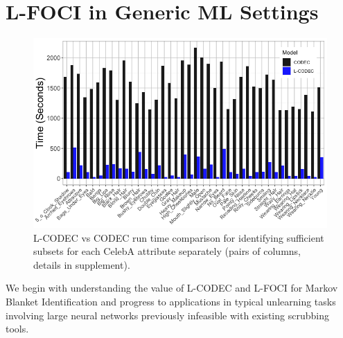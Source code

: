 \section{L-FOCI in Generic ML Settings}
\begin{figure}
    \centering
    \includegraphics[width=0.98\columnwidth,trim={0, 0, 0, 0},clip]{5_unlearn/figs/Speed_Hist.png}
    \caption[Speedups from L-CODEC randomization]{\label{fig:speed_hist} L-CODEC vs CODEC run time comparison for identifying sufficient subsets for each CelebA attribute separately (pairs of columns, details in supplement).}
\end{figure}
We begin with understanding the value of L-CODEC and L-FOCI for Markov Blanket Identification and progress to applications
in typical unlearning tasks involving large neural networks previously infeasible with existing scrubbing tools.

